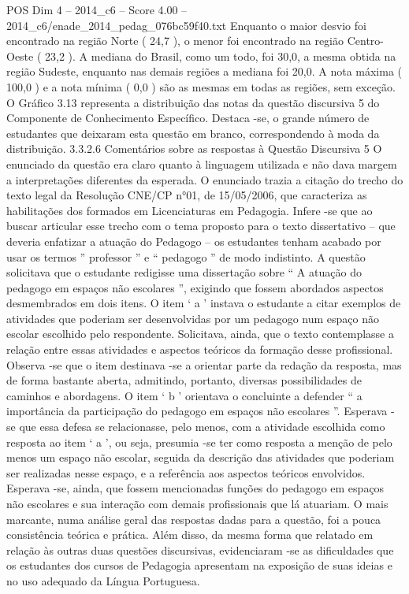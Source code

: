 \begin{textsample}{POS Dim 4 – 2014\_c6 – Score 4.00 – 2014\_c6/enade\_2014\_pedag\_076bc59f40.txt}
Enquanto o maior desvio foi encontrado na região Norte ( 24,7 ), o menor foi encontrado na região Centro-Oeste ( 23,2 ).
A mediana do Brasil, como um todo, foi 30,0, a mesma obtida na região Sudeste, enquanto nas demais regiões a mediana foi 20,0.
A nota máxima ( 100,0 ) e a nota mínima ( 0,0 ) são as mesmas em todas as regiões, sem exceção.
O Gráfico 3.13 representa a distribuição das notas da questão discursiva 5 do Componente de Conhecimento Específico.
Destaca -se, o grande número de estudantes que deixaram esta questão em branco, correspondendo à moda da distribuição. 3.3.2.6 Comentários sobre as respostas à Questão Discursiva 5 O enunciado da questão era claro quanto à linguagem utilizada e não dava margem a interpretações diferentes da esperada.
O enunciado trazia a citação do trecho do texto legal da Resolução CNE/CP n{\EmojiFont °}01, de 15/05/2006, que caracteriza as habilitações dos formados em Licenciaturas em Pedagogia.
Infere -se que ao buscar articular esse trecho com o tema proposto para o texto dissertativo – que deveria enfatizar a atuação do Pedagogo – os estudantes tenham acabado por usar os termos ” professor ” e “ pedagogo ” de modo indistinto.
A questão solicitava que o estudante redigisse uma dissertação sobre “ A atuação do pedagogo em espaços não escolares ”, exigindo que fossem abordados aspectos desmembrados em dois itens.
O item ‘ a ’ instava o estudante a citar exemplos de atividades que poderiam ser desenvolvidas por um pedagogo num espaço não escolar escolhido pelo respondente.
Solicitava, ainda, que o texto contemplasse a relação entre essas atividades e aspectos teóricos da formação desse profissional.
Observa -se que o item destinava -se a orientar parte da redação da resposta, mas de forma bastante aberta, admitindo, portanto, diversas possibilidades de caminhos e abordagens.
O item ‘ b ’ orientava o concluinte a defender “ a importância da participação do pedagogo em espaços não escolares ”.
Esperava -se que essa defesa se relacionasse, pelo menos, com a atividade escolhida como resposta ao item ‘ a ’, ou seja, presumia -se ter como resposta a menção de pelo menos um espaço não escolar, seguida da descrição das atividades que poderiam ser realizadas nesse espaço, e a referência aos aspectos teóricos envolvidos.
Esperava -se, ainda, que fossem mencionadas funções do pedagogo em espaços não escolares e sua interação com demais profissionais que lá atuariam.
O mais marcante, numa análise geral das respostas dadas para a questão, foi a pouca consistência teórica e prática.
Além disso, da mesma forma que relatado em relação às outras duas questões discursivas, evidenciaram -se as dificuldades que os estudantes dos cursos de Pedagogia apresentam na exposição de suas ideias e no uso adequado da Língua Portuguesa.

\end{textsample}
